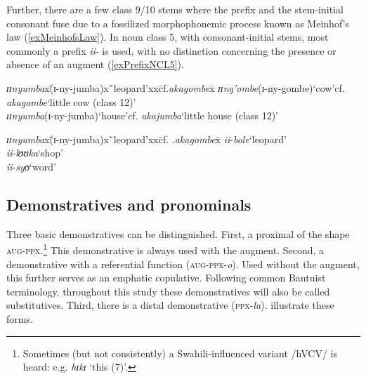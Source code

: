Further, there are a few class 9/10 stems where the prefix and the stem-initial consonant fuse due to a fossilized morphophonemic process known as Meinhof's law (\ref{exMeinhofsLaw}). In noun class 5, with consonant-initial stems, most commonly a prefix \textit{ii}- is used, with no distinction concerning the presence or absence of an augment (\ref{exPrefixNCL5}).
\begin{exe}
	\ex\label{exMeinhofsLaw}
	\begin{tabbing}
		\textit{ɪɪnyumba}x\=(\degree ɪ-ny-jumba)x\=`leopard'xx\=cf.\textit{akagombe}x\=\kill%
		\textit{ɪɪng'ombe}\>(\degree ɪ-ny-gombe)\>`cow'\>cf. \textit{akagombe}\>`little cow (class 12)'
		\\\textit{ɪɪnyumba}\>(\degree ɪ-ny-jumba)\>`house'\>cf. \textit{akajumba}\>`little house (class 12)'
	\end{tabbing}
	\ex\label{exPrefixNCL5}
	\begin{tabbing}
		\textit{ɪɪnyumba}x\=(\degree ɪ-ny-jumba)x\=`leopard'xx\=cf. .\textit{akagombe}x\=\kill%
		\textit{ii}-\textit{bole}\>`leopard'\\
		\textit{ii}-\textit{lʊʊka}\>`shop'\\
		\textit{ii}-\textit{syʊ}\>`word'
	\end{tabbing}
\end{exe}

\subsection{Demonstratives and pronominals}\label{Demonstratives} 


Three basic demonstratives can be distinguished. First, a proximal of the shape \textsc{aug}-\textsc{ppx}.\footnote{Sometimes (but not consistently) a Swahili-influenced variant /hVCV/ is heard: e.g. \textit{hɪkɪ} `this (7)'.} This demonstrative is always used with the augment. Second, a demonstrative with a referential function (\textsc{aug}-\textsc{ppx}-\textit{o}). Used without the augment, this further serves as an emphatic copulative. Following common Bantuist terminology, throughout this study these demonstratives will also be called substitutives. Third, there is a distal demonstrative (\textsc{ppx}-\textit{la}).  illustrate these forms. 

